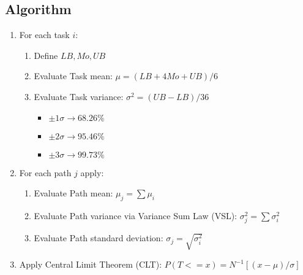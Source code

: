 \documentclass[letterpaper,10pt,english]{jupyterBook}
\begin{document}
\subsection{Algorithm}
\label{\detokenize{PM/jcsrua:algorithm}}\begin{enumerate}
%
\item {} 
\sphinxAtStartPar
For each task \(i\):
\begin{enumerate}
%
\item {} 
\sphinxAtStartPar
Define \(LB,Mo,UB\)

\item {} 
\sphinxAtStartPar
Evaluate Task mean: \(\mu = (LB+4Mo + UB)/6\)

\item {} 
\sphinxAtStartPar
Evaluate Task variance: \(\sigma^2 = (UB-LB)/36\)
\begin{itemize}
\item {} 
\sphinxAtStartPar
\(\pm 1\sigma \rightarrow 68.26\% \)

\item {} 
\sphinxAtStartPar
\(\pm 2\sigma \rightarrow 95.46\% \)

\item {} 
\sphinxAtStartPar
\(\pm 3\sigma \rightarrow 99.73\% \)

\end{itemize}

\end{enumerate}

\item {} 
\sphinxAtStartPar
For each path \(j\) apply:
\begin{enumerate}
%
\item {} 
\sphinxAtStartPar
Evaluate Path mean: \(\mu_j = \sum \mu_i\)

\item {} 
\sphinxAtStartPar
Evaluate Path variance via Variance Sum Law (VSL): \(\sigma^2_j = \sum \sigma^2_i\)

\item {} 
\sphinxAtStartPar
Evaluate Path standard deviation: \(\sigma_j = \sqrt{\sigma^2_i}\)

\end{enumerate}

\item {} 
\sphinxAtStartPar
Apply Central Limit Theorem (CLT): \(P(T <= x) = N^{-1}[(x-\mu)/\sigma]\)

\end{enumerate}
\end{document}
